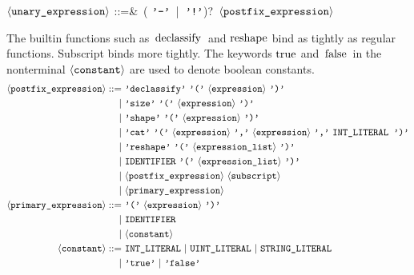 \documentclass[a4paper, 10pt, draft]{report}
\newcommand{\mycode}[1]{\ensuremath{\mbox{\lstinline{#1}}}}
\newcommand{\litQuote}[1]{\textcolor{black}{\texttt{'#1'}}}
\newcommand{\grammarRules}[1]{\small{\singlespacing\vspace{-2em}\begin{align*}#1\end{align*}}}
\newcommand{\bnfNT}[1]{\ensuremath{\mathbf{\left\langle\mbox{\texttt{#1}}\right\rangle}}}
\newcommand{\bnfT}[1]{\ensuremath{\mbox{\litQuote{#1}}}}
\newcommand{\bnfM}[1]{\ensuremath{\mbox{\textcolor{black}{\texttt{\uppercase{#1}}}}}} %
\begin{document}
{%
  \bnfNT{unary\_expression} ::=&\ \left( \bnfT{-}\ |\ \bnfT{!}\right)?\ \bnfNT{postfix\_expression} \\
}

The builtin functions such as \mycode{declassify} and \mycode{reshape} bind as
tightly as regular functions. Subscript binds more tightly.  The keywords
\mycode{true} and \mycode{false} in the nonterminal \bnfNT{constant} are used
to denote boolean constants.
\grammarRules{
  \bnfNT{postfix\_expression} ::=&\ \bnfT{declassify}\ \bnfT{(}\ \bnfNT{expression}\ \bnfT{)} \\
                                |&\ \bnfT{size}\ \bnfT{(}\ \bnfNT{expression}\ \bnfT{)} \\
                                |&\ \bnfT{shape}\ \bnfT{(}\ \bnfNT{expression}\ \bnfT{)} \\
                                |&\ \bnfT{cat}\ \bnfT{(}\ \bnfNT{expression}\ \bnfT{,}\ \bnfNT{expression}\ \bnfT{,}\ \bnfM{INT\_LITERAL\ } \bnfT{)} \\
                                |&\ \bnfT{reshape}\ \bnfT{(}\ \bnfNT{expression\_list}\ \bnfT{)} \\
                                |&\ \bnfM{IDENTIFIER}\ \bnfT{(}\ \bnfNT{expression\_list}\ \bnfT{)} \\
                                |&\ \bnfNT{postfix\_expression}\ \bnfNT{subscript} \\
                                |&\ \bnfNT{primary\_expression} \\
  \bnfNT{primary\_expression} ::=&\ \bnfT{(}\ \bnfNT{expression}\ \bnfT{)}\\
                                |&\ \bnfM{IDENTIFIER}\\
                                |&\ \bnfNT{constant} \\
  \bnfNT{constant} ::=&\ \bnfM{INT\_LITERAL}\ |\ \bnfM{UINT\_LITERAL}\ |\ \bnfM{STRING\_LITERAL}\\
                     |&\ \bnfT{true}\ |\ \bnfT{false}
}
\end{document}
